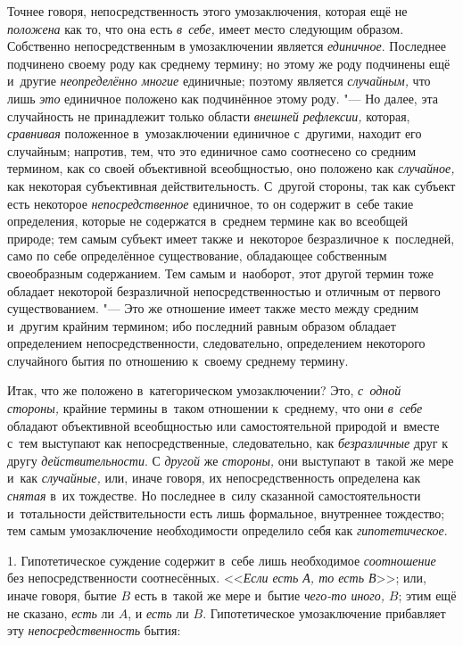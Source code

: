 Точнее говоря, непосредственность этого умозаключения, которая
ещё не {\em положена} как
то, что она есть {\em в~себе,}
имеет место следующим образом. Собственно непосредственным в
умозаключении является {\em единичное}.
Последнее подчинено своему роду как среднему термину; но
этому же роду подчинены ещё и~другие
{\em неопределённо многие}
единичные; поэтому является
{\em случайным,} что лишь
{\em это} единичное
положено как подчинённое этому роду. "--- Но далее, эта
случайность не принадлежит только области
{\em внешней рефлексии,}
которая, {\em сравнивая}
положенное в~умозаключении единичное с~другими, находит его
случайным; напротив, тем, что это единичное само соотнесено со средним
термином, как со своей объективной всеобщностью, оно положено как
{\em случайное,} как
некоторая субъективная действительность. С~другой стороны, так как субъект
есть некоторое {\em непосредственное}
единичное, то он содержит в~себе такие определения, которые
не содержатся в~среднем термине как во всеобщей природе; тем самым субъект
имеет также и~некоторое безразличное к~последней, само по себе определённое
существование, обладающее собственным своеобразным
содержанием. Тем самым и~наоборот, этот другой
термин
тоже обладает некоторой безразличной непосредственностью и
отличным от первого существованием. "--- Это же отношение имеет
также место между средним и~другим крайним термином; ибо последний равным
образом обладает определением непосредственности, следовательно,
определением некоторого случайного бытия по отношению к~своему среднему
термину.

Итак, что же положено в~категорическом умозаключении? Это,
{\em с~одной стороны,}
крайние термины в~таком отношении к~среднему, что они
{\em в~себе} обладают
объективной всеобщностью или самостоятельной природой и~вместе с~тем
выступают как непосредственные, следовательно, как
{\em безразличные} друг к
другу {\em действительности}.
С {\em другой}
же {\em стороны,}
они выступают в~такой же мере и~как
{\em случайные,} или,
иначе говоря, их непосредственность определена как
{\em снятая} в~их
тождестве. Но последнее в~силу сказанной самостоятельности и~тотальности
действительности есть лишь формальное, внутреннее тождество; тем самым
умозаключение необходимости определило себя как
{\em гипотетическое}.


1. Гипотетическое суждение содержит в~себе лишь необходимое
{\em соотношение} без непосредственности соотнесённых.
<<{\em Если есть А, то есть В}>>; или, иначе говоря, бытие $B$ есть в~такой же
мере и~бытие {\em чего-то иного,} $B$; этим ещё не сказано, {\em есть} ли
$A$, и {\em есть} ли $B$. Гипотетическое умозаключение прибавляет эту
{\em непосредственность} бытия:

